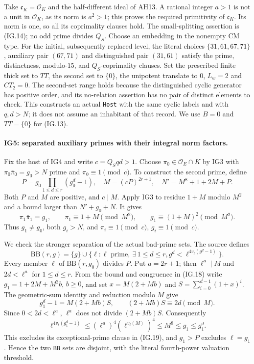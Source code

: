 Take $\mathfrak c_K=\mathcal O_K$ and the half-different ideal of
AH13. A rational integer $a>1$ is not a unit in $\mathcal O_K$,
as its norm is $a^2>1$; this proves the required primitivity of
$\mathfrak c_K$. Its norm is one, so all its coprimality clauses
hold. The small-splitting assertion is (IG.14); no odd prime
divides $Q_S$. Choose an embedding in the nonempty CM type.
For the initial, subsequently replaced level, the literal choices
$\{31,61,67,71\}$, auxiliary pair $(67,71)$ and distinguished
pair $(31,61)$ satisfy the prime, distinctness, modulo-$15$, and
$Q_S$-coprimality clauses. Set the prescribed finite thick set
to $TT$, the second set to $\{0\}$, the unipotent translate to
$0$, $L_w=2$ and $CT_2=0$. The second-set range holds because
the distinguished cyclic generator has positive order, and its
no-relation assertion has no pair of distinct elements to check.
This constructs an actual \texttt{Host} with the same cyclic
labels and with $q,d>N$; it does not assume an inhabitant of that
record. We use $B=0$ and $TT=\{0\}$ for (IG.13).

\paragraph{IG5: separated auxiliary primes with their integral norm factors.}
Fix the host of IG4 and write $c=Q_Sqd>1$. Choose
$\pi_0\in\mathcal O_E\cap K$ by IG3 with
$\pi_0\bar\pi_0=g_0>N$ prime and $\pi_0\equiv1\pmod c$.
To construct the second prime, define
\[
 P=g_0\prod_{1\le d\le r}(g_0^d-1),\quad
       M=(cP)^{2r+1},\quad
       N'=M^8+1+2M+P.                                 \tag{IG.17}
\]
Both $P$ and $M$ are positive, and $c\mid M$.
Apply IG3 to residue $1+M$ modulo $M^2$ and a bound larger
than $N'+g_0+N$. It gives
\[
 \pi_1\bar\pi_1=g_1,\qquad
 \pi_1\equiv1+M\pmod {M^2},\qquad
 g_1\equiv(1+M)^2\pmod {M^2}.                         \tag{IG.18}
\]
Thus $g_1\ne g_0$, both $g_i>N$, and
$\pi_i\equiv1\pmod c$, $g_i\equiv1\pmod c$.

We check the stronger separation of the actual bad-prime sets.
The source defines
\[
 \mathrm{BB}(r,g)=\{g\}\cup
 \{\ell:\ell\text{ prime},\ \exists\,1\le d\le r,
                   g^d<\ell^{4v_\ell(g^d-1)}\}.       \tag{IG.19}
\]
Every member $\ell$ of $\mathrm{BB}(r,g_0)$ divides $P$.
Put $a=2r+1$; then $\ell^a\mid M$ and $2d<\ell^a$ for
$1\le d\le r$. From the bound and congruence in (IG.18) write
$g_1=1+2M+M^2b$, $b\ge0$, and set
$x=M(2+Mb)$ and $S=\sum_{i=0}^{d-1}(1+x)^i$.
The geometric-sum identity and reduction modulo $M$ give
\[
 g_1^d-1=M(2+Mb)S,
       \qquad (2+Mb)S\equiv2d\pmod M.                 \tag{IG.20}
\]
Since $0<2d<\ell^a$, $\ell^a$ does not divide $(2+Mb)S$.
Consequently
\[
 \ell^{4v_\ell(g_1^d-1)}
 \le (\ell^a)^4(\ell^{v_\ell(M)})^4
 \le M^8\le g_1\le g_1^d.                            \tag{IG.21}
\]
This excludes its exceptional-prime clause in (IG.19), and
$g_1>P$ excludes $\ell=g_1$. Hence the two \texttt{BB} sets
are disjoint, with the literal fourth-power valuation threshold.

